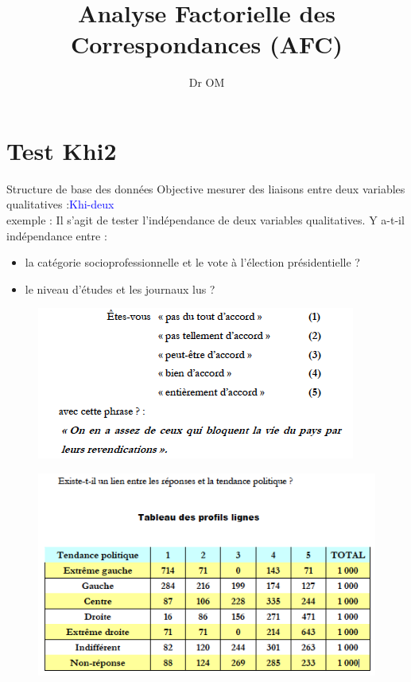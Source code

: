\documentclass[11pt]{beamer}
\author{Dr OM}
\title{Analyse Factorielle des Correspondances (AFC)}
\institute{LMI-SFA-UNA}
\begin{document}
\begin{frame}
\titlepage
\end{frame}

\begin{frame}
\tableofcontents
\end{frame}
\section{Test Khi2}
\begin{frame}{Structure de base des données}
Objective mesurer des liaisons entre deux variables qualitatives :\textcolor{blue}{Khi-deux}\\
exemple : 
Il s’agit de tester l’indépendance de deux variables qualitatives.
Y a-t-il indépendance entre :


\begin{itemize}
\item la catégorie socioprofessionnelle et le vote à l’élection
présidentielle ?
\item  le niveau d’études et les journaux lus ?
\end{itemize}

\begin{figure}
\includegraphics[scale=0.6]{Exemple.png}  
\end{figure}
\end{frame}

\begin{frame}{}
\begin{figure}
\includegraphics[scale=0.6]{Exemple2.png}  
\end{figure}
\end{frame}
\end{document}
